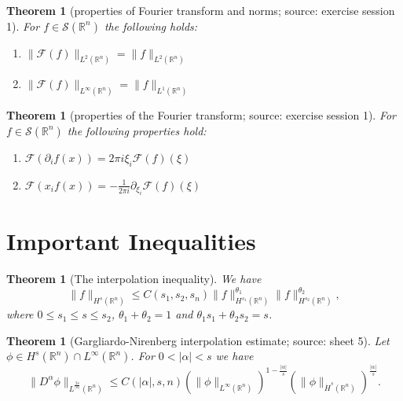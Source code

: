 \documentclass[12pt,a4paper]{article}
\newtheorem{thm}[definition]{Theorem}
\newcommand{\Rn}{\mathbb{R}^n}
\begin{document}
\begin{thm}[properties of Fourier transform and norms; source: exercise session 1]
For $f\in \mathcal{S}(\mathbb{R}^n)$ the following holds:
\begin{enumerate}
\item $\lVert \mathcal{F}(f) \rVert_{L^2(\mathbb{R}^n)} = \lVert f \rVert_{L^2(\mathbb{R}^n)}$
\item $\lVert \mathcal{F}(f) \rVert_{L^{\infty}(\mathbb{R}^n)} = \lVert f \rVert_{L^1(\mathbb{R}^n)}$
\end{enumerate}
\end{thm}

\begin{thm}[properties of the Fourier transform; source: exercise session 1]
For $f\in \mathcal{S}(\mathbb{R}^n)$ the following properties hold:
\begin{enumerate}
\item $\mathcal{F}(\partial_if(x))=2\pi i \xi_i \mathcal{F}(f)(\xi)$ 
\item $\mathcal{F}(x_if(x))=-\frac{1}{2\pi i} \partial_{\xi_i} \mathcal{F}(f)(\xi)$
\end{enumerate}
\end{thm}

\section{Important Inequalities}

\begin{thm}[The interpolation inequality]
We have
\begin{equation}
\lVert f \rVert_{H^s(\Rn)} \leq C(s_1,s_2,s_n)\lVert f \rVert_{H^{s_1}(\Rn)}^{\theta_1} \lVert f \rVert_{H^{s_2}(\Rn)}^{\theta_2},
\end{equation}
where $0\leq s_1\leq s \leq s_2$, $\theta_1+\theta_2=1$ and $\theta_1s_1+\theta_2s_2=s$.
\end{thm}

\begin{thm}[Gargliardo-Nirenberg interpolation estimate; source: sheet 5]
Let $\phi \in H^s(\Rn)\cap L^{\infty}(\Rn)$. For $0<\vert \alpha \vert < s$ we have
\begin{equation}
\lVert D^{\alpha} \phi \rVert_{L^{\frac{2s}{\vert \alpha \vert}}(\Rn)} \leq C(\vert \alpha \vert,s,n)(\lVert \phi \rVert_{L^{\infty}(\Rn)})^{1-\frac{\vert \alpha \vert}{s}}(\lVert \phi \rVert _{\dot H^s(\Rn)})^{\frac{\vert \alpha \vert}{s}}.
\end{equation}
\end{thm}
\end{document}
